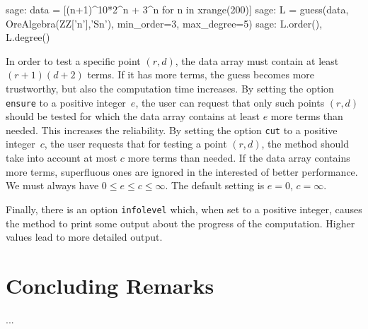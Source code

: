 \documentclass{amsart}
\begin{document}
\begin{sageexample}
sage: data = [(n+1)^10*2^n + 3^n for n in xrange(200)]
sage: L = guess(data, OreAlgebra(ZZ['n'],'Sn'), min_order=3, max_degree=5)
sage: L.order(), L.degree()
\end{sageexample}

In order to test a specific point $(r,d)$, the data array must contain at least $(r+1)(d+2)$ terms. 
If it has more terms, the guess becomes more trustworthy, but also the computation time increases.
By setting the option \verb|ensure| to a positive integer~$e$, the user can request that only 
such points $(r,d)$ should be tested for which the data array contains at least $e$ more terms than
needed. This increases the reliability. By setting the option \verb|cut| to a positive integer~$c$,
the user requests that for testing a point $(r,d)$, the method should take into account at most $c$
more terms than needed. If the data array contains more terms, superfluous ones are ignored in the
interested of better performance. We must always have $0\leq e\leq c\leq \infty$. The default setting
is $e=0$, $c=\infty$. 

Finally, there is an option \verb|infolevel| which, when set to a positive integer, causes the method
to print some output about the progress of the computation. Higher values lead to more detailed output.

\section{Concluding Remarks}

...

 
 
 
\end{document}
